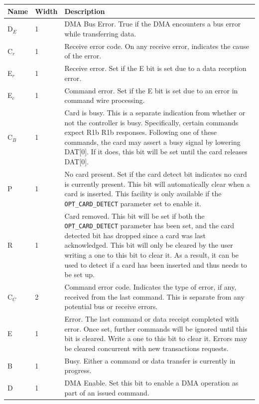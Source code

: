 \documentclass{gqtekspec}
\begin{document}
\begin{table}\begin{center}
\begin{tabular}{|p{1.2in}|p{0.5in}|p{4.0in}|}\hline
	\rowcolor[gray]{0.85} Name & Width & Description\\\hline\hline
D$_E$&1& DMA Bus Error.  True if the DMA encounters a bus error while
	transferring data. \\
C$_r$&1& Receive error code.  On any receive error, indicates the cause of
	the error. \\
E$_r$&1& Receive error.  Set if the E bit is set due to a data reception error.
	\\
E$_c$&1& Command error.  Set if the E bit is set due to an error in command
	wire processing.  \\
C$_B$&1& Card is busy.  This is a separate indication from whether or not the
	controller is busy.  Specifically, certain commands expect R1b
	R1b responses.  Following one of these commands, the card may assert a
	busy signal by lowering DAT[0].  If it does, this bit will be set
	until the card releases DAT[0].\\
P & 1 & No card present.  Set if the card detect bit indicates no card is
	currently present.  This bit will automatically clear when a card
	is inserted.  This facility is only available if the
	{\tt OPT\_CARD\_DETECT} parameter set to enable it.\\
R & 1 & Card removed.  This bit will be set if both the {\tt OPT\_CARD\_DETECT}
	parameter has been set, and the card detected bit has dropped since
	a card was last acknowledged.  This bit will only be cleared by the user
	writing a one to this bit to clear it.   As a result, it can be used
	to detect if a card has been inserted and thus needs to be set up. \\
C$_C$&2& Command error code.  Indicates the type of error, if any, received
	from the last command.  This is separate from any potential bus or
	receive errors. \\
E & 1 & Error.  The last command or data receipt completed with error.  
	Once set, further commands will be ignored until this bit is cleared.
	Write a one to this bit to clear it.  Errors may be cleared concurrent
	with new transactions requests. \\
B & 1 & Busy.  Either a command or data transfer is currently in progress.\\
D & 1 & DMA Enable.  Set this bit to enable a DMA operation as part of an
	issued command. \\

\end{tabular}
\end{center}
\end{table}
\end{document}
